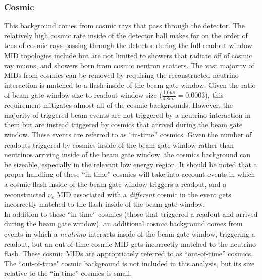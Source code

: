 \subsubsection{Cosmic}
This background comes from cosmic rays that pass through the detector. The relatively high cosmic rate inside of the detector hall makes for on the order of tens of cosmic rays passing through the detector during the full readout window. MID topologies include but are not limited to showers that radiate off of cosmic ray muons, and showers born from cosmic neutron scatters. The vast majority of MIDs from cosmics can be removed by requiring the reconstructed neutrino interaction is matched to a flash inside of the beam gate window. Given the ratio of beam gate window size to readout window size ($\frac{1.6\mu s}{4.8ms}=0.0003$), this requirement mitigates almost all of the cosmic backgrounds. However, the majority of triggered beam events are not triggered by a neutrino interaction in them but are instead triggered by cosmics that arrived during the beam gate window. These events are referred to as ``in-time'' cosmics. Given the number of readouts triggered by cosmics inside of the beam gate window rather than neutrinos arriving inside of the beam gate window, the cosmics background can be sizeable, especially in the relevant low energy region. It should be noted that a proper handling of these ``in-time'' cosmics will take into account events in which a cosmic flash inside of the beam gate window triggers a readout, and a reconstructed $\nu_e$ MID associated with a \textit{different} cosmic in the event gets incorrectly matched to the flash inside of the beam gate window.\\

In addition to these ``in-time'' cosmics (those that triggered a readout and arrived during the beam gate window), an additional cosmic background comes from events in which a \textit{neutrino} interacts inside of the beam gate window, triggering a readout, but an out-of-time cosmic MID gets incorrectly matched to the neutrino flash. These cosmic MIDs are appropriately referred to as ``out-of-time'' cosmics. The ``out-of-time" cosmic background is not included in this analysis, but its size relative to the ``in-time'' cosmics is small.\\



